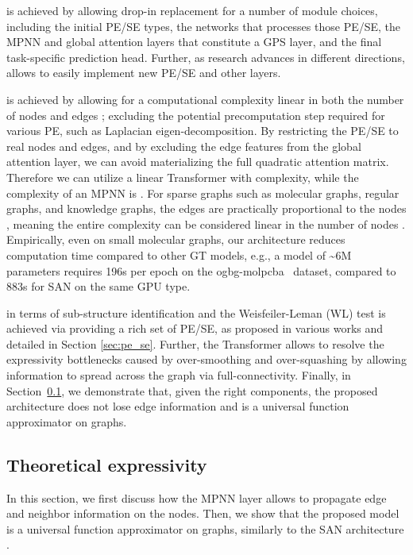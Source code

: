 \documentclass{article}
\begin{document}
 is achieved by allowing drop-in replacement for a number of module choices, including the initial PE/SE types, the networks that processes those PE/SE, the MPNN and global attention layers that constitute a GPS layer, and the final task-specific prediction head. Further, as research advances in different directions, \gtgym allows to easily implement new PE/SE and other layers.

 is achieved by allowing for a computational complexity linear in both the number of nodes and edges ; excluding the potential precomputation step required for various PE, such as Laplacian eigen-decomposition.
By restricting the PE/SE to real nodes and edges, and by excluding the edge features from the global attention layer, we can avoid materializing the full quadratic attention matrix. Therefore we can utilize a linear Transformer with  complexity, while the complexity of an MPNN is . For sparse graphs such as molecular graphs, regular graphs, and knowledge graphs, the edges are practically proportional to the nodes , meaning the entire complexity can be considered linear in the number of nodes .
Empirically, even on small molecular graphs, our architecture reduces computation time compared to other GT models, e.g., a model of \textasciitilde6M parameters requires 196s per epoch on the ogbg-molpcba~\cite{hu2020ogb} dataset, compared to 883s for SAN \cite{kreuzer2021rethinking} on the same GPU type.


 in terms of sub-structure identification and the Weisfeiler-Leman (WL) test is achieved via providing a rich set of PE/SE, as proposed in various works \cite{beaini2021directional_dgn, kreuzer2021rethinking, dwivedi2022LPE, bodnar2021weisfeiler_CIN, bouritsas2022improving_GSN} and detailed in Section \ref{sec:pe_se}. Further, the Transformer allows to resolve the expressivity bottlenecks caused by over-smoothing \cite{kreuzer2021rethinking} and over-squashing \cite{alon2021on} by allowing information to spread across the graph via full-connectivity. Finally, in Section~\ref{sec:theory}, we demonstrate that, given the right components, the proposed architecture does not lose edge information and is a universal function approximator on graphs.



\subsection{Theoretical expressivity}\label{sec:theory}
In this section, we first discuss how the MPNN layer allows to propagate edge and neighbor information on the nodes. Then, we show that the proposed model is a universal function approximator on graphs, similarly to the SAN architecture \cite{kreuzer2021rethinking}.
\end{document}
